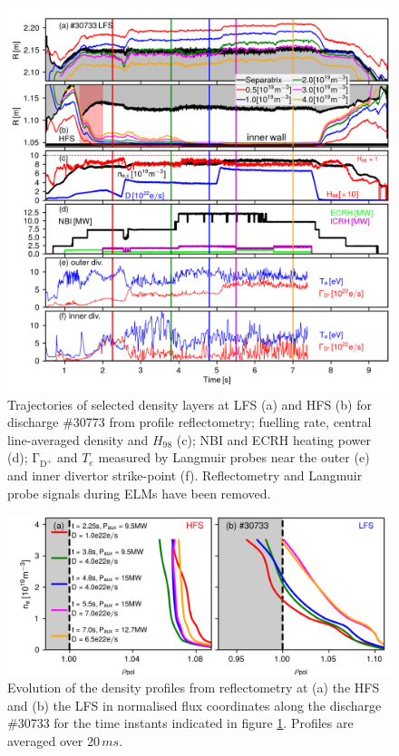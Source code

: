 \documentclass[12pt]{iopart}
\begin{document}
\begin{figure}[!hbt]
    \centering
    \includegraphics[]{Figure4.png}
    \caption[Overview of discharge \#30733.]{Trajectories of selected density layers at LFS (a) and HFS (b) for discharge \#30773 from profile reflectometry; fuelling rate, central line-averaged density and $H_{98}$ (c); NBI and ECRH heating power (d); $\mathrm{\Gamma_{D^{+}}}$ and $T_e$ measured by Langmuir probes near the outer (e) and inner divertor strike-point (f). Reflectometry and Langmuir probe signals during ELMs have been removed.}
    \label{fig:layers_30733}
\end{figure}

\begin{figure}[!bt]
    \centering
    \includegraphics[]{Figure5.png}
    \caption[Density profile evolution for discharge \#30733.]{Evolution of the density profiles from reflectometry at (a) the HFS and (b) the LFS in normalised flux coordinates along the discharge \#30733 for the time instants indicated in figure \ref{fig:layers_30733}. Profiles are averaged over $20\,ms$.}
    \label{fig:perfs_30733}
\end{figure}
\end{document}
